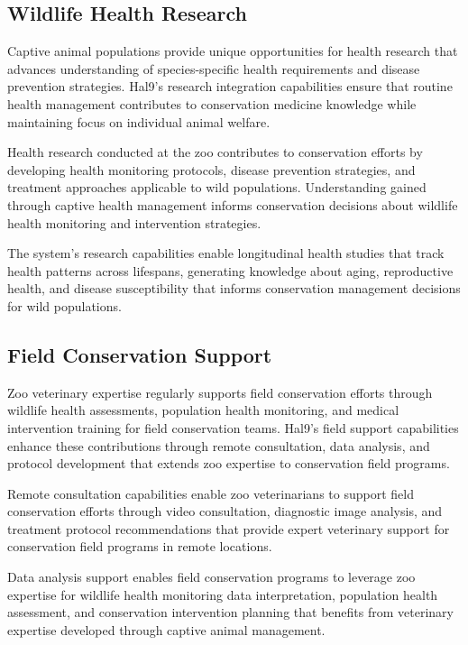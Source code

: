 \documentclass[
  Letterpaper,
]{scrbook}
\begin{document}
\subsection{Wildlife Health Research}\label{wildlife-health-research}

Captive animal populations provide unique opportunities for health
research that advances understanding of species-specific health
requirements and disease prevention strategies. Hal9's research
integration capabilities ensure that routine health management
contributes to conservation medicine knowledge while maintaining focus
on individual animal welfare.

Health research conducted at the zoo contributes to conservation efforts
by developing health monitoring protocols, disease prevention
strategies, and treatment approaches applicable to wild populations.
Understanding gained through captive health management informs
conservation decisions about wildlife health monitoring and intervention
strategies.

The system's research capabilities enable longitudinal health studies
that track health patterns across lifespans, generating knowledge about
aging, reproductive health, and disease susceptibility that informs
conservation management decisions for wild populations.

\subsection{Field Conservation
Support}\label{field-conservation-support}

Zoo veterinary expertise regularly supports field conservation efforts
through wildlife health assessments, population health monitoring, and
medical intervention training for field conservation teams. Hal9's field
support capabilities enhance these contributions through remote
consultation, data analysis, and protocol development that extends zoo
expertise to conservation field programs.

Remote consultation capabilities enable zoo veterinarians to support
field conservation efforts through video consultation, diagnostic image
analysis, and treatment protocol recommendations that provide expert
veterinary support for conservation field programs in remote locations.

Data analysis support enables field conservation programs to leverage
zoo expertise for wildlife health monitoring data interpretation,
population health assessment, and conservation intervention planning
that benefits from veterinary expertise developed through captive animal
management.
\end{document}
